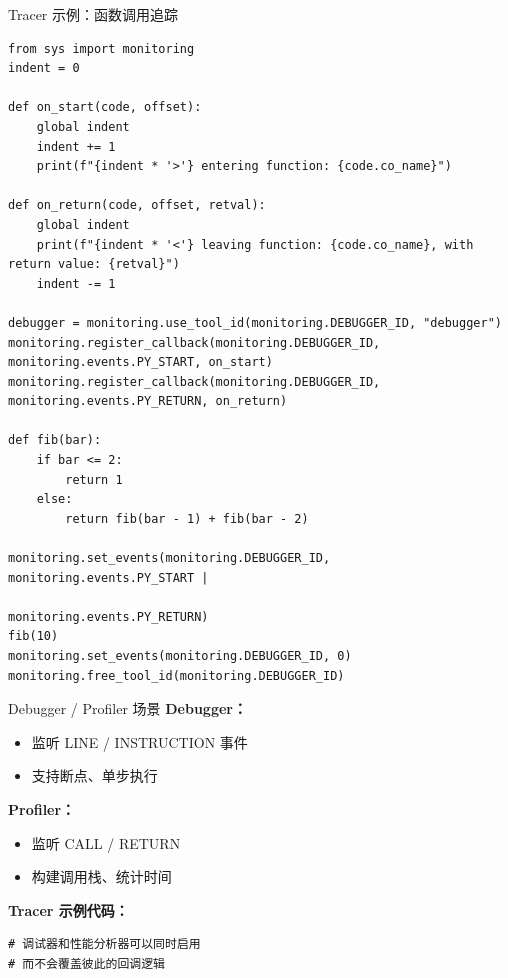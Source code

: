 \documentclass{beamer}
\begin{document}
\begin{frame}[fragile]{Tracer 示例：函数调用追踪}
\tiny
\begin{verbatim}
from sys import monitoring
indent = 0

def on_start(code, offset):
    global indent
    indent += 1
    print(f"{indent * '>'} entering function: {code.co_name}")

def on_return(code, offset, retval):
    global indent
    print(f"{indent * '<'} leaving function: {code.co_name}, with return value: {retval}")
    indent -= 1

debugger = monitoring.use_tool_id(monitoring.DEBUGGER_ID, "debugger")
monitoring.register_callback(monitoring.DEBUGGER_ID, monitoring.events.PY_START, on_start)
monitoring.register_callback(monitoring.DEBUGGER_ID, monitoring.events.PY_RETURN, on_return)

def fib(bar):
    if bar <= 2:
        return 1
    else:
        return fib(bar - 1) + fib(bar - 2)

monitoring.set_events(monitoring.DEBUGGER_ID, monitoring.events.PY_START |
                                              monitoring.events.PY_RETURN)
fib(10)
monitoring.set_events(monitoring.DEBUGGER_ID, 0)
monitoring.free_tool_id(monitoring.DEBUGGER_ID)
\end{verbatim}
\end{frame}

\begin{frame}[fragile]{Debugger / Profiler 场景}
\textbf{Debugger：}
\begin{itemize}
  \item 监听 LINE / INSTRUCTION 事件
  \item 支持断点、单步执行
\end{itemize}

\textbf{Profiler：}
\begin{itemize}
  \item 监听 CALL / RETURN
  \item 构建调用栈、统计时间
\end{itemize}

\textbf{Tracer 示例代码：}
\begin{verbatim}
# 调试器和性能分析器可以同时启用
# 而不会覆盖彼此的回调逻辑
\end{verbatim}
\end{frame}
\end{document}
